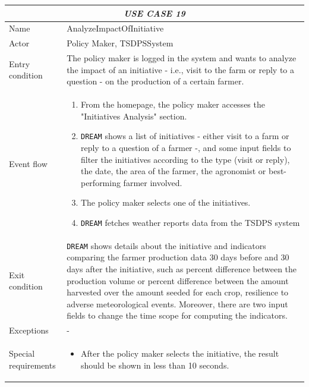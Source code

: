 \documentclass{article}
\begin{document}

\centering
\begin{longtable}{|p{3.5cm}|m{8cm}|}
 \hline
 \multicolumn{2}{|c|}{\cellcolor{white}\emph{USE CASE 19}} \\
 \endfirsthead
 \endhead
 \endfoot
 \endlastfoot
 \hline
 Name & AnalyzeImpactOfInitiative\\
 \hline
 Actor & Policy Maker, TSDPSSystem\\
 \hline
 Entry condition & The policy maker is logged in the system and wants to analyze the impact of an initiative - i.e., visit to the farm or reply to a question - on the production of a certain farmer.\\
 \hline
 Event flow & \begin{enumerate}
    \item From the homepage, the policy maker accesses the "Initiatives Analysis" section.
    \item \verb|DREAM| shows a list of initiatives - either visit to a farm or reply to a question of a farmer -, and some input fields to filter the initiatives according to the type (visit or reply), the date, the area of the farmer, the agronomist or best-performing farmer involved.
    \item The policy maker selects one of the initiatives.
    \item \verb|DREAM| fetches weather reports data from the TSDPS system
 \end{enumerate}\\
 \hline
 Exit condition &  \verb|DREAM| shows details about the initiative and indicators comparing the farmer production data 30 days before and 30 days after the initiative, such as percent difference between the production volume or percent difference between the amount harvested over the amount seeded for each crop, resilience to adverse meteorological events. Moreover, there are two input fields to change the time scope for computing the indicators.\\
 \hline
 Exceptions & -\\
 \hline
 Special requirements &\begin{itemize}
     \item After the policy maker selects the initiative, the result should be shown in less than 10 seconds.
 \end{itemize}\\
 \hline
\end{longtable}
\end{document}
